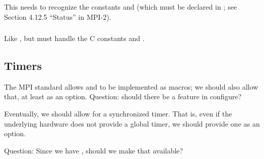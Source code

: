 \documentclass{article}
\begin{document}

\subsubsection{}
This needs to recognize the constants  and
 (which must be declared in ; see
Section 4.12.5 ``Status'' in MPI-2).  

\subsubsection{}
Like , but must handle the C constants
 and .

\subsection{Timers}
\label{sec:timer}
The MPI standard allows  and  to be
implemented as macros; we should also allow that, at least as an
option.  Question:  should there be a
 feature in
configure?

Eventually, we should allow for a synchronized timer.  That is, even
if the underlying hardware does not provide a global timer, we should
provide one as an option.

Question: Since we have , should we make that available?
\end{document}
